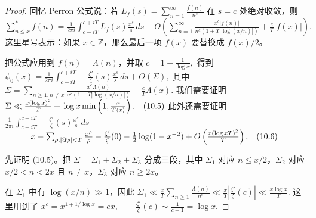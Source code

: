 \begin{proof}
	回忆 Perron 公式说：若
	\(\textstyle L_f(s)=\allowbreak{}\sum_{n=\allowbreak{}1}^{\infty}\frac{f(n)}{n^s}\)
	在 $s=c$ 处绝对收敛，则
	\(\textstyle \sum_{n\leq\allowbreak{} x}^{*}f(n) =\allowbreak{} \frac1{2\pi i} \int_{c-iT}^{c+\allowbreak{}iT} L_f(s)\frac{x^s}{s}\,ds +\allowbreak{} O\left( \sum_{n=\allowbreak{}1}^{\infty} \frac{x^c|f(n)|}{n^c(1+\allowbreak{}T|\log(x/n)|)} +\allowbreak{} \frac{c}{T}|f(x)| \right).\)
	这里星号表示：如果 $x\in\mathbb Z$，那么最后一项 $f(x)$ 要替换成 $f(x)/2$。

	把公式应用到 $f(n)=\Lambda(n)$，并取
	\(\textstyle c=\allowbreak{}1+\allowbreak{}\frac1{\log x},\allowbreak{}\)
	得到
	\(\textstyle \psi_0(x) =\allowbreak{} \frac1{2\pi i} \int_{c-iT}^{c+\allowbreak{}iT} -\frac{\zeta'}{\zeta}(s)\frac{x^s}{s}\,ds +\allowbreak{} O(\Sigma),\allowbreak{}\)
	其中
	\(\textstyle \Sigma =\allowbreak{} \sum_{n\geq\allowbreak{}1,\allowbreak{} n\neq\allowbreak{} x} \frac{x^c\Lambda(n)}{n^c(1+\allowbreak{}T|\log(x/n)|)} +\allowbreak{} \frac{c}{T}\Lambda(x).\)
	我们需要证明
	\(\textstyle \Sigma \ll\allowbreak{} \frac{x(\log x)^2}{T} +\allowbreak{} \log x\min\left(1,\allowbreak{}\frac{x}{T\langle x\rangle}\right). \quad\textup{(10.5)}\)
	此外还需要证明
	\(\textstyle \frac1{2\pi i} \int_{c-iT}^{c+\allowbreak{}iT} -\frac{\zeta'}{\zeta}(s)\frac{x^s}{s}\,ds\) \(\textstyle \qquad=\allowbreak{} x - \sum_{\rho,\allowbreak{} |\Im\rho|<T}\frac{x^\rho}{\rho} - \frac{\zeta'}{\zeta}(0) - \frac12\log(1-x^{-2}) +\allowbreak{} O\left(\frac{x(\log xT)^2}{T}\right). \quad\textup{(10.6)}\)

	先证明 (10.5)。把
	\(\textstyle \Sigma=\allowbreak{}\Sigma_1+\allowbreak{}\Sigma_2+\allowbreak{}\Sigma_3\)
	分成三段，其中 $\Sigma_1$ 对应 $n\leq x/2$，$\Sigma_2$ 对应
	$x/2<n<2x$ 且 $n\neq x$，$\Sigma_3$ 对应 $n\geq 2x$。

	在 $\Sigma_1$ 中有 $\log(x/n)\gg 1$，因此
	\(\textstyle \Sigma_1 \ll\allowbreak{} \frac{x}{T}\sum_{n\geq1}\frac{\Lambda(n)}{n^c} \ll\allowbreak{} \frac{x}{T}\left|\frac{\zeta'}{\zeta}(c)\right| \ll\allowbreak{} \frac{x\log x}{T}.\)
	这里用到了
	\(\textstyle x^c=\allowbreak{}x^{1+\allowbreak{}1/\log x}=\allowbreak{}ex,\allowbreak{} \qquad \frac{\zeta'}{\zeta}(c)\sim\allowbreak{} \frac{1}{c-1}=\allowbreak{}\log x.\)


\end{proof}
